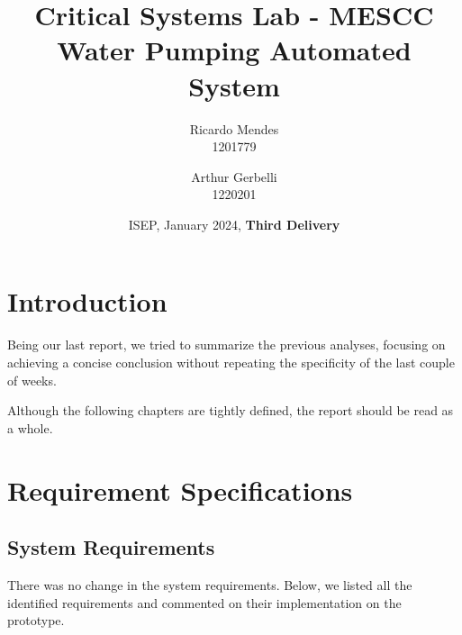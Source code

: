 \documentclass[11pt]{article}
\title{\textbf{Critical Systems Lab - MESCC\\ Water Pumping Automated System}}
\date{ISEP, January 2024, \textbf{Third Delivery}}
\author{Ricardo Mendes\\ 1201779
\and Arthur Gerbelli\\ 1220201}
\begin{document}
\maketitle              
\newpage
\tableofcontents
\newpage

%
\section{Introduction}

Being our last report, we tried to summarize the previous analyses, focusing on achieving a concise conclusion without repeating the specificity of the last couple of weeks. 

Although the following chapters are tightly defined, the report should be read as a whole. 

\section{Requirement Specifications}

\subsection{System Requirements}

There was no change in the system requirements. Below, we listed all the identified requirements and commented on their implementation on the prototype. 
\end{document}
